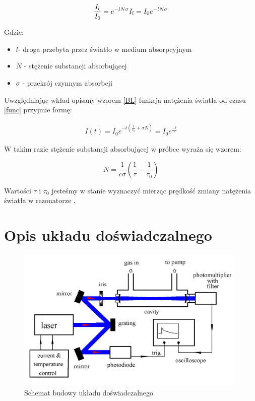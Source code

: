 \documentclass[10pt,a4paper]{article}
\begin{document}
\begin{equation}
    \label{BL}
    \frac{I_l}{I_0}= e^{-lN\sigma}\\
    I_l = I_0 e^{-lN\sigma}
\end{equation}

Gdzie:
\begin{itemize}
    \item $l$- droga przebyta przez światło w medium absorpcyjnym
    \item $N$ - stężenie substancji absorbującej
    \item $\sigma$ - przekrój czynnym absorbcji
\end{itemize}

Uwzględniając wkład opisany wzorem \ref{BL} funkcja natężenia światła od czasu \ref{func} przyjmie formę: 

\begin{gather}
    \label{funccorr}
    I(t) = I_0 e^{-t \left(\frac{1}{\tau_0} +\sigma N \right)} = I_0 e^{\frac{-t}{\tau}}
\end{gather}


W takim razie stężenie substancji absorbującej w próbce wyraża się wzorem:

\begin{equation}
    \label{stęż}
    N = \frac{1}{c \sigma}\left( \frac{1}{\tau} - \frac{1}{\tau_0} \right)
\end{equation}

Wartości $\tau$ i $\tau_0$ jesteśmy w stanie wyznaczyć mierząc prędkość zmiany natężenia światła  w rezonatorze \cite{sswo}.

\newpage

\section{Opis układu doświadczalnego}

\begin{figure}[h]
    \centering
    \includegraphics[width=11cm]{pictures/uklad.jpg}
    \caption{Schemat budowy układu doświadczalnego \cite{sswo}}
    \label{schem}
\end{figure}
\end{document}
